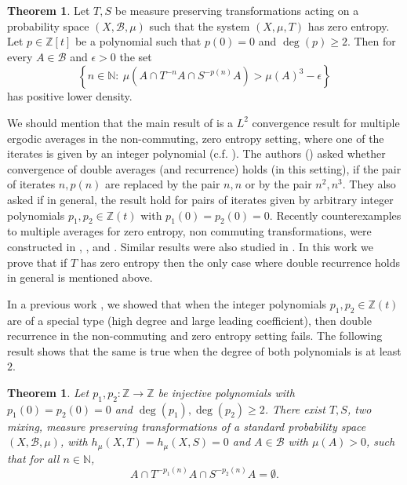 \documentclass[12pt,reqno]{amsart}
\newcommand{\N}{\mathbb{N}}
\newcommand{\Z}{\mathbb{Z}}
\newcommand{\B}{\mathcal{B}}
\newtheorem{thm}{Theorem}[section]
\theoremstyle{definition}
\newtheorem*{thm*}{Theorem}
\begin{document}
\begin{thm*}\cite[Theorem 1.3.]{Frantzikinakis_Host_2023} Let $T, S$ be measure preserving transformations acting on a probability
space $(X, \B, \mu)$ such that the system $(X, \mu, T)$ has zero entropy. Let $p \in \Z[t]$ be a polynomial such that $p(0)=0$ and $\deg (p) \geq 2$. Then for every $A \in \B$ and $\epsilon>0$ the set
\[
\left\{n\in\mathbb{N}:\ \mu\left(A\cap T^{-n}A\cap S^{-p(n)}A\right)> \mu(A)^3 - \epsilon\right\}
\]
has positive lower density. 
\end{thm*}
We should mention that the main result of \cite{Frantzikinakis_Host_2023} is a $L^2$ convergence result for multiple ergodic averages  in the non-commuting, zero entropy setting, where one of the iterates is given by an integer polynomial (c.f. \cite[Theorem 1.1.]{Frantzikinakis_Host_2023}). The authors (\cite[Problem, page 1639]{Frantzikinakis_Host_2023}) asked whether convergence of double averages (and recurrence) holds (in this setting), if the pair of iterates $n,p(n)$ are replaced by the pair $n,n$ or by the pair $n^2,n^3$. They also asked if in general, the result hold for pairs of iterates given by arbitrary integer polynomials $p_1, p_2 \in \Z(t)$ with $p_1(0) = p_2(0) = 0$. Recently counterexamples to multiple averages for zero entropy, non commuting transformations, were constructed in \cite{Huang_Shao_Ye_2024_A}, \cite{Austin_2025}, \cite{Huang_Shao_Ye_2024_B} and \cite{kosloff_Sanadhya_2024}. Similar results were also studied in \cite{Ryzhikov_2024_A}. In this work we prove that if $T$ has zero entropy then the only case where double recurrence holds in general is \cite[Theorem 1.3.]{Frantzikinakis_Host_2023} mentioned above. 

 In a previous work \cite[Theorem 1.4.]{kosloff_Sanadhya_2024}, we showed that when the integer polynomials $p_1,p_2 \in \Z(t)$ are of a special type (high degree and large leading coefficient), then double recurrence in the non-commuting and zero entropy setting fails. The following result shows that the same is true when the degree of both polynomials is at least $2$.  

 \begin{thm}\label{thm:recurrence_1} Let $p_1,p_2:\Z\to\Z$ be injective polynomials with $p_1(0) = p_2(0) = 0$ and $\deg (p_1),\deg (p_2) \geq 2$. There exist $T,S$, two mixing, measure preserving transformations of a standard probability space $(X,\B,\mu)$, with $h_{\mu}(X,T) = h_{\mu}(X,S) = 0$ and $A\in\B$ with $\mu(A)>0$, such that for all $n\in\N$,
\[
A\cap T^{-p_1(n)}A\cap S^{-p_2(n)}A = \emptyset.
\]
\end{thm}
\end{document}
